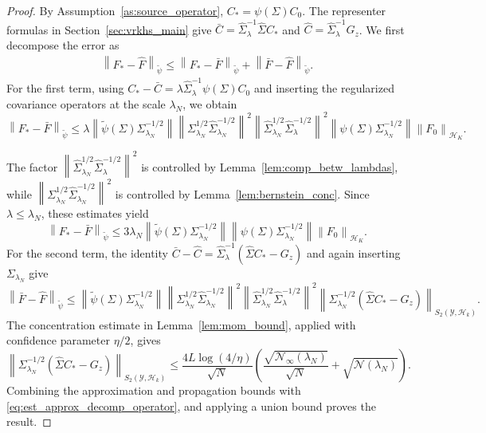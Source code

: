 \documentclass[11pt]{article}
\numberwithin{equation}{section}
\theoremstyle{plain}
\theoremstyle{definition}
\theoremstyle{remark}
\newcommand{\Hs}{\mathcal{H}}
\newcommand{\Y}{\mathcal{Y}}
\newcommand{\norm}[1]{\left\lVert#1\right\rVert}
\newcommand{\tpsi}{\widetilde{\psi}}
\begin{document}
\begin{proof}
By Assumption~\ref{as:source_operator},
$C_*=\psi(\Sigma)C_0$. The representer formulas in
Section~\ref{sec:vrkhs_main} give
$\bar{C}=\hat{\Sigma}_{\lambda}^{-1}\hat{\Sigma}C_*$ and
$\hat{C}=\hat{\Sigma}_{\lambda}^{-1}G_z$.
We first decompose the error as
\begin{align}
\norm{F_*-\hat{F}}_{\tpsi}
\leq
\norm{F_*-\bar{F}}_{\tpsi}
+
\norm{\bar{F}-\hat{F}}_{\tpsi}.
\label{eq:est_approx_decomp_operator}
\end{align}
For the first term, using
$C_*-\bar{C}=\lambda\hat{\Sigma}_{\lambda}^{-1}\psi(\Sigma)C_0$
and inserting the regularized covariance operators at the scale $\lambda_N$,
we obtain
\begin{equation}
\norm{F_*-\bar{F}}_{\tpsi}
\leq
\lambda
\norm{\tpsi(\Sigma)\Sigma_{\lambda_N}^{-1/2}}
\norm{\Sigma_{\lambda_N}^{1/2}
\hat{\Sigma}_{\lambda_N}^{-1/2}}^{2}
\norm{\hat{\Sigma}_{\lambda_N}^{1/2}
\hat{\Sigma}_{\lambda}^{-1/2}}^{2}
\norm{\psi(\Sigma)\Sigma_{\lambda_N}^{-1/2}}
\norm{F_0}_{\Hs_K}.
\label{eq:approximation_factorization_operator}
\end{equation}

The factor
\(
\norm{\hat{\Sigma}_{\lambda_N}^{1/2}
\hat{\Sigma}_{\lambda}^{-1/2}}^{2}
\)
is controlled by Lemma~\ref{lem:comp_betw_lambdas}, while
\(
\norm{\Sigma_{\lambda_N}^{1/2}
\hat{\Sigma}_{\lambda_N}^{-1/2}}^{2}
\)
is controlled by Lemma~\ref{lem:bernstein_conc}. Since
$\lambda\leq\lambda_N$, these estimates yield
\[
\norm{F_*-\bar{F}}_{\tpsi}
\leq
3\lambda_N
\norm{\tpsi(\Sigma)\Sigma_{\lambda_N}^{-1/2}}
\norm{\psi(\Sigma)\Sigma_{\lambda_N}^{-1/2}}
\norm{F_0}_{\Hs_K}.
\]
For the second term, the identity
\(
\bar{C}-\hat{C}
=
\hat{\Sigma}_{\lambda}^{-1}
(\hat{\Sigma}C_*-G_z)
\)
and again inserting  $\Sigma_{\lambda_N}$ give
\begin{equation}
\norm{\bar{F}-\hat{F}}_{\tpsi}
\leq
\norm{\tpsi(\Sigma)\Sigma_{\lambda_N}^{-1/2}}
\norm{\Sigma_{\lambda_N}^{1/2}
\hat{\Sigma}_{\lambda_N}^{-1/2}}^{2}
\norm{\hat{\Sigma}_{\lambda_N}^{1/2}
\hat{\Sigma}_{\lambda}^{-1/2}}^{2}
\norm{\Sigma_{\lambda_N}^{-1/2}
(\hat{\Sigma}C_*-G_z)}_{S_2(\Y,\Hs_k)}.
\label{eq:propagation_factorization_operator}
\end{equation}
The concentration estimate in
Lemma~\ref{lem:mom_bound}, applied with confidence parameter $\eta/2$, gives
\[
\norm{\Sigma_{\lambda_N}^{-1/2}
(\hat{\Sigma}C_*-G_z)}_{S_2(\Y,\Hs_k)}
\leq
\frac{4L\log(4/\eta)}{\sqrt{N}}
\left(
\frac{\sqrt{\mathcal{N}_{\infty}(\lambda_N)}}{\sqrt{N}}
+
\sqrt{\mathcal{N}(\lambda_N)}
\right).
\]
Combining the approximation and propagation bounds with
\eqref{eq:est_approx_decomp_operator}, and applying a union bound proves the result.
\end{proof}
\end{document}
